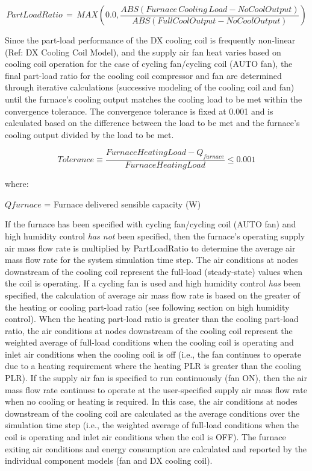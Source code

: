 \begin{equation}
PartLoadRatio\, = \,MAX\left( {0.0,\frac{{ABS\left( {Furnace\,Cooling\,Load - NoCoolOutput} \right)}}{{ABS\left( {FullCoolOutput - NoCoolOutput} \right)}}} \right)
\end{equation}

Since the part-load performance of the DX cooling coil is frequently non-linear (Ref: DX Cooling Coil Model), and the supply air fan heat varies based on cooling coil operation for the case of cycling fan/cycling coil (AUTO fan), the final part-load ratio for the cooling coil compressor and fan are determined through iterative calculations (successive modeling of the cooling coil and fan) until the furnace's cooling output matches the cooling load to be met within the convergence tolerance. The convergence tolerance is fixed at 0.001 and is calculated based on the difference between the load to be met and the furnace's cooling output divided by the load to be met.

\begin{equation}
  Tolerance \equiv \frac{FurnaceHeatingLoad - Q_{furnace}}{FurnaceHeatingLoad} \leq 0.001
\end{equation}

where:

\(Qfurnace\) = Furnace delivered sensible capacity (W)

If the furnace has been specified with cycling fan/cycling coil (AUTO fan) and high humidity control \emph{has not} been specified, then the furnace's operating supply air mass flow rate is multiplied by PartLoadRatio to determine the average air mass flow rate for the system simulation time step. The air conditions at nodes downstream of the cooling coil represent the full-load (steady-state) values when the coil is operating. If a cycling fan is used and high humidity control \emph{has} been specified, the calculation of average air mass flow rate is based on the greater of the heating or cooling part-load ratio (see following section on high humidity control). When the heating part-load ratio is greater than the cooling part-load ratio, the air conditions at nodes downstream of the cooling coil represent the weighted average of full-load conditions when the cooling coil is operating and inlet air conditions when the cooling coil is off (i.e., the fan continues to operate due to a heating requirement where the heating PLR is greater than the cooling PLR). If the supply air fan is specified to run continuously (fan ON), then the air mass flow rate continues to operate at the user-specified supply air mass flow rate when no cooling or heating is required. In this case, the air conditions at nodes downstream of the cooling coil are calculated as the average conditions over the simulation time step (i.e., the weighted average of full-load conditions when the coil is operating and inlet air conditions when the coil is OFF). The furnace exiting air conditions and energy consumption are calculated and reported by the individual component models (fan and DX cooling coil).

